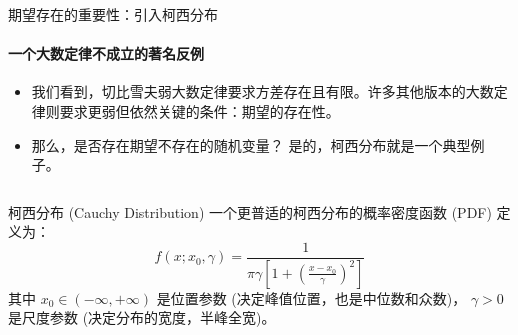 \documentclass[UTF8]{beamer}
\begin{document}
\begin{frame}[shrink=10]{期望存在的重要性：引入柯西分布}
    \framesubtitle{一个大数定律不成立的著名反例}
    \begin{itemize}
        \item 我们看到，切比雪夫弱大数定律要求方差存在且有限。许多其他版本的大数定律则要求更弱但依然关键的条件：\alert{期望的存在性}。
        \item 那么，是否存在期望不存在的随机变量？ \alert{是的，柯西分布就是一个典型例子。}
    \end{itemize}
    \pause
    \begin{columns}[T] %
        \begin{column}{0.55\textwidth}
            \begin{block}{柯西分布 (Cauchy Distribution)}
                一个更普适的柯西分布的概率密度函数 (PDF) 定义为：
                \[ f(x; x_0, \gamma) = \frac{1}{\pi\gamma \left[1 + \left(\frac{x-x_0}{\gamma}\right)^2\right]} \]
                其中 $x_0 \in (-\infty, +\infty)$ 是位置参数 (决定峰值位置，也是中位数和众数)，
                $\gamma > 0$ 是尺度参数 (决定分布的宽度，半峰全宽)。
                

\end{block}
\end{column}
\end{columns}
\end{frame}
\end{document}
